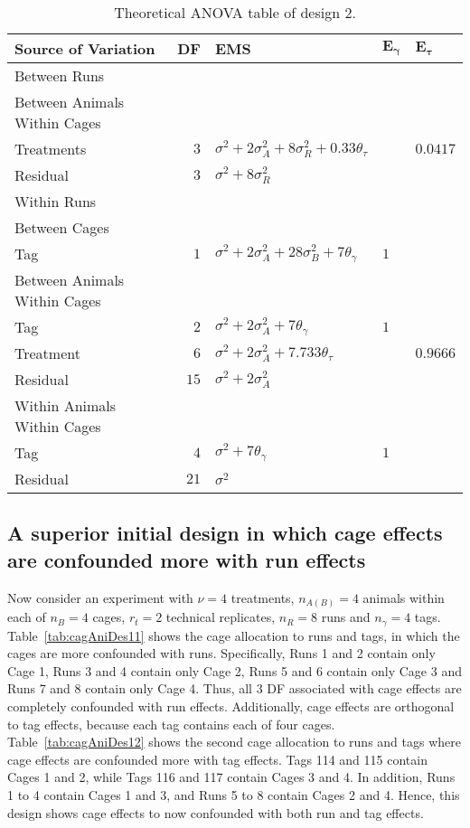 \begin{table}[h!]
 \caption{Theoretical ANOVA table of design 2.}
 \begin{tabular}[t]{lrlll} 
 \toprule 
 \multicolumn{1}{l}{\textbf{Source of Variation}} & \multicolumn{1}{l}{\textbf{DF}} & \multicolumn{1}{l}{\textbf{EMS}}& \multicolumn{1}{l}{$\bm{E_{\gamma}}$}&\multicolumn{1}{l}{$\bm{E_{\tau}}$}\\ 
 \midrule 
 Between Runs &  &  & & \\ 
 \quad Between Animals Within Cages &  &  & & \\ 
 \quad \quad Treatments & $3$ & $\sigma^2+2\sigma_{A}^2+8\sigma_{R}^2+0.33\theta_{\tau}$ & & $0.0417$\\ 
 \quad Residual & $3$ & $\sigma^2+8\sigma_{R}^2$ & & \\ \hline
 Within Runs &  &  & & \\ 
 \quad Between Cages &  &  & & \\ 
 \quad \quad Tag & $1$ & $\sigma^2+2\sigma_{A}^2+28\sigma_{B}^2+7\theta_{\gamma}$ &$1$ & \\ \hline
 \quad Between Animals Within Cages &  &  & & \\ 
 \quad \quad Tag & $2$ & $\sigma^2+2\sigma_{A}^2+7\theta_{\gamma}$ &$1$ & \\ 
 \quad \quad Treatment & $6$ & $\sigma^2+2\sigma_{A}^2+7.733\theta_{\tau}$ & & $0.9666$\\ 
 \quad \quad Residual & $15$ & $\sigma^2+2\sigma_{A}^2$ & & \\ \hline
 \quad Within Animals Within Cages &  &  & & \\ 
 \quad \quad Tag & $4$ & $\sigma^2+7\theta_{\gamma}$ &$1$ & \\ 
 \quad \quad Residual & $21$ & $\sigma^2$ & & \\ 
 \bottomrule 
 \end{tabular} 
 \label{tab:Phase2ANOVA8} 
\end{table} 


\subsection{A superior initial design in which cage effects are confounded more with run effects}
Now consider an experiment with $\nu = 4$ treatments, $n_{A(B)} = 4$ animals within each of $n_B = 4$ cages, $r_t = 2$ technical replicates, $n_R = 8$ runs and $n_\gamma = 4$ tags. Table~\ref{tab:cagAniDes11} shows the cage allocation to runs and tags, in which the cages are more confounded with runs. Specifically, Runs 1 and 2 contain only Cage 1, Runs 3 and 4 contain only Cage 2, Runs 5 and 6 contain only Cage 3 and Runs 7 and 8 contain only Cage 4. Thus, all 3 DF associated with cage effects are completely confounded with run effects. Additionally, cage effects are orthogonal to tag effects, because each tag contains each of four cages. Table~\ref{tab:cagAniDes12} shows the second cage allocation to runs and tags where cage effects are confounded more with tag effects. Tags 114 and 115 contain Cages 1 and 2, while Tags 116 and 117 contain Cages 3 and 4. In addition, Runs 1 to 4 contain Cages 1 and 3, and Runs 5 to 8 contain Cages 2 and 4. Hence, this design shows cage effects to now confounded with both run and tag effects. 

